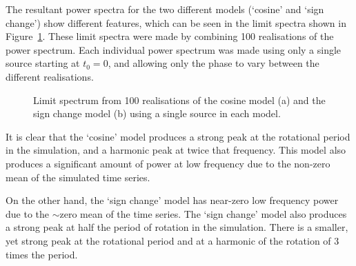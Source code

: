 The resultant power spectra for the two different models (`cosine' and `sign change') show different features, which can be seen in the limit spectra shown in Figure~\ref{fig:artificial_LS}. These limit spectra were made by combining 100 realisations of the power spectrum. Each individual power spectrum was made using only a single source starting at $t_0 = 0$, and allowing only the phase to vary between the different realisations.

\begin{figure}[ht!]
	\centering
	\qquad
	\caption{Limit spectrum from 100 realisations of the cosine model (a) and the sign change model (b) using a single source in each model.}  \label{fig:artificial_LS}
\end{figure}

It is clear that the `cosine' model produces a strong peak at the rotational period in the simulation, and a harmonic peak at twice that frequency. This model also produces a significant amount of power at low frequency due to the non-zero mean of the simulated time series. 

On the other hand, the `sign change' model has near-zero low frequency power due to the $\sim$zero mean of the time series. The `sign change' model also produces a strong peak at half the period of rotation in the simulation. There is a smaller, yet strong peak at the rotational period and at a harmonic of the rotation of 3 times the period.


